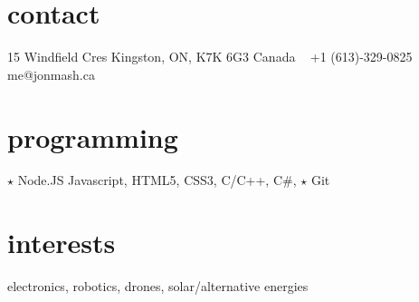 
\begin{aside}
%
\section{contact}
15 Windfield Cres
Kingston, ON, K7K 6G3
Canada
~
+1 (613)-329-0825
~
me@jonmash.ca
%
\section{programming}
{\color{orange} $\star$} Node.JS
Javascript, HTML5, CSS3, C/C++, C\#, 
{\color{orange} $\star$} Git
%
\section{interests}
electronics, robotics, drones, solar/alternative energies
%
\end{aside}